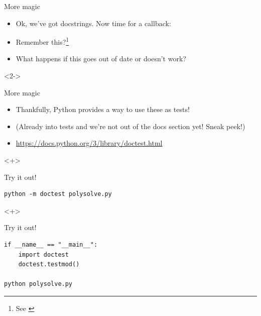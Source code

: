 \documentclass[usenames,dvipsnames]{beamer}
\newcommand{\filet}[1]{\textcolor{blue}{\texttt{\detokenize{#1}}}}
\begin{document}
\begin{frame}{More magic}
    \begin{itemize}[<+->]
        \item{}Ok, we've got docstrings. Now time for a callback:
        \item{}Remember this?\footnote[5]{See \filet{quadexm.py}}
        \item{}What happens if this goes out of date or doesn't work?
    \end{itemize}

    \begin{onlyenv}<2->
        
    \end{onlyenv}
\end{frame}

\begin{frame}[fragile]{More magic}
    \begin{itemize}[<+->]
        \item{}Thankfully, Python provides a way to use these as tests!
        \item{}{\scriptsize (Already into tests and we're not out of the docs section yet! Sneak peek!)}
        \item{}\url{https://docs.python.org/3/library/doctest.html}
    \end{itemize}

    

    \begin{onlyenv}<+>
        \begin{block}{Try it out!}
            \begin{lstlisting}
python -m doctest polysolve.py
            \end{lstlisting}
        \end{block}
    \end{onlyenv}
        
    \begin{onlyenv}<+>
        \begin{block}{Try it out!}
            \begin{lstlisting}
if __name__ == "__main__":
    import doctest
    doctest.testmod()

python polysolve.py
            \end{lstlisting}
        \end{block}
    \end{onlyenv}
\end{frame}
\end{document}

